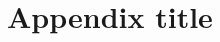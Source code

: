 \chapter{Appendix title}%
\label{app:dependances}

\begin{center}
    \begin{verbatim}
    \end{verbatim}
\end{center}
